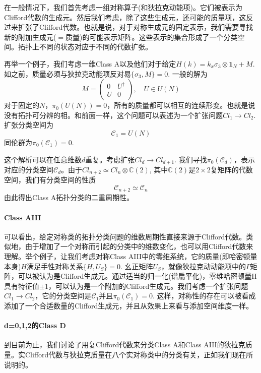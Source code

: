 \documentclass[a4paper]{article}
\numberwithin{equation}{subsection}
\begin{document}
在一般情况下，我们首先考虑一组对称算子(和狄拉克动能项)。它们被表示为Clifford代数的生成元。然后我们考虑，除了这些生成元，还可能的质量项，这反过来扩张了Clifford代数。也就是说，对于对称生成元的固定表示，我们需要寻找新的附加生成元($=$质量)的可能表示矩阵。这些表示的集合形成了一个分类空间。拓扑上不同的状态对应于不同的代数扩张。  

再举一个例子，我们考虑一维Class A以及他们对于给定$H(k)=k_x\sigma_3\otimes\mathbf{1}_{N}+M$. 如之前，质量必须与狄拉克动能项反对易$\{\sigma_3,M\}=0$. 一般的解为
\begin{equation}
    M=\begin{pmatrix}
        0&U^\dagger\\
        U&0
    \end{pmatrix},\quad U\in U(N)
\end{equation}
对于固定的$N$，$\pi_0(U(N))=0$，所有的质量都可以相互的连续形变。也就是说没有拓扑可分辨的相。和前面一样，这个问题可以表述为一个扩张问题$Cl_1\rightarrow Cl_2$. 扩张分类空间为
\begin{equation}
    \mathcal{C}_1=U(N)
\end{equation}
同伦群为$\pi_0(\mathcal{C}_1)=0$.

这个解析可以在任意维数$d$重复。考虑扩张$Cl_d\rightarrow Cl_{d+1}$. 我们寻找$\pi_0(\mathcal{C}_d)$，表示对应的分类空间$\mathcal{C}_d$。由于$Cl_{n+2}\simeq Cl_n\otimes \mathbb{C}(2)$, 其中$\mathbb{C}(2)$是$2\times 2$复矩阵的代数空间，我们有分类空间的性质
\begin{equation}
    \mathcal{C}_{n+2}\simeq\mathcal{C}_n
\end{equation}
由此得出Class A拓扑分类的二重周期性。
\paragraph{Class AIII}
可以看出，给定对称类的拓扑分类问题的维数周期性直接来源于Clifford代数。类似地，由于增加了一个对称而引起的分类中的维数变化，也可以用Clifford代数来理解。举个例子，让我们考虑对称Class AIII中的零维系统，它的质量(即哈密顿量本身)$H$满足手性对称关系$\{H,U_S\}=0$. 幺正矩阵$U_S$，就像狄拉克动动能项中的$\Gamma$矩阵，可以被认为是Clifford生成元。通过适当的归一化(谱扁平化)，零维哈密顿量H具有特征值$\pm 1$，可以认为是一个附加的Clifford生成元。我们考虑一个扩张问题$Cl_1\rightarrow Cl_2$，它的分类空间是$\mathcal{C}_1$并且$\pi_0(\mathcal{C}_1)=0$. 这样，对称性的存在可以被看成添加了一个合适数量的Clifford生成元，并且从效果上来看与添加空间维度一样。
\paragraph{d=0,1,2的Class D}
到目前为止，我们讨论了用复Clifford代数来分类Class A和Class AIII的狄拉克质量。实Clifford代数与狄拉克质量在八个实对称类中的分类有关，正如我们现在所说明的。
\end{document}

